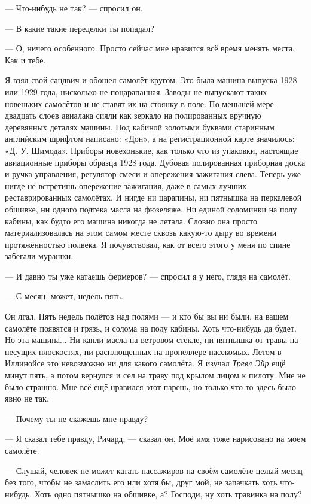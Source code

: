 --- Что-нибудь не так? --- спросил он.

--- В какие такие переделки ты попадал?

--- О, ничего особенного. Просто сейчас мне нравится всё время менять места. Как и тебе.

Я взял свой сандвич и обошел самолёт кругом. Это была машина выпуска 1928 или 1929 года, нисколько не поцарапанная. Заводы не выпускают таких новеньких самолётов и не ставят их на стоянку в поле. По меньшей мере двадцать слоев авиалака сияли как зеркало на полированных вручную деревянных деталях машины. Под кабиной золотыми буквами старинным английским шрифтом написано: «Дон», а на регистрационной карте значилось: «Д. У. Шимода». Приборы новехонькие, как только что из упаковки, настоящие авиационные приборы образца 1928 года. Дубовая полированная приборная доска и ручка управления, регулятор смеси и опережения зажигания слева. Теперь уже нигде не встретишь опережение зажигания, даже в самых лучших реставрированных самолётах. И нигде ни царапины, ни пятнышка на перкалевой обшивке, ни одного подтёка масла на фюзеляже. Ни единой соломинки на полу кабины, как будто его машина никогда не летала. Словно она просто материализовалась на этом самом месте сквозь какую-то дыру во времени протяжённостью полвека. Я почувствовал, как от всего этого у меня по спине забегали мурашки.

--- И давно ты уже катаешь фермеров? --- спросил я у него, глядя на самолёт.

--- С месяц, может, недель пять.

Он лгал. Пять недель полётов над полями --- и кто бы вы ни были, на вашем самолёте появятся и
грязь, и солома на полу кабины. Хоть что-нибудь да будет. Но эта машина... Ни капли масла на
ветровом стекле, ни пятнышка от травы на несущих плоскостях, ни расплющенных на пропеллере
насекомых. Летом в Иллинойсе это невозможно ни для какого самолёта. Я изучал {\it Тревл Эйр\/} ещё
минут пять, а потом вернулся и сел на траву под крылом лицом к пилоту. Мне не было страшно. Мне
всё ещё нравился этот парень, но только что-то здесь было явно не так.

--- Почему ты не скажешь мне правду?

--- Я сказал тебе правду, Ричард, --- сказал он. Моё имя тоже нарисовано на моем самолёте.

--- Слушай, человек не может катать пассажиров на своём самолёте целый месяц без того, чтобы не замаслить его или хотя бы, друг мой, не запачкать хоть что-нибудь. Хоть одно пятнышко на обшивке, а? Господи, ну хоть травинка на полу?

